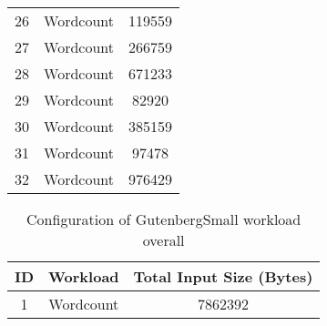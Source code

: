 \documentclass[print,ms]{nuthesis}%
\begin{document}
\begin{table}[h!]
\begin{center}
\begin{threeparttable}
\begin{tabular}{c|c|c}
      26 & Wordcount & 119559  \\
      27 & Wordcount & 266759  \\
      28 & Wordcount & 671233  \\
      29 & Wordcount & 82920  \\
      30 & Wordcount & 385159  \\
      31 & Wordcount & 97478 \\
      32 & Wordcount & 976429 \\   
      \bottomrule %
    \end{tabular}
   \begin{tablenotes}
      \small
      \item %
    \end{tablenotes}
  \end{threeparttable}
  \end{center}
   
\end{table}

\begin{table}[H]%
\tiny
  \begin{center}
     \begin{threeparttable}

    \caption{Configuration of GutenbergSmall workload overall}
    \label{tab:table2}
    \begin{tabular}{c|c|c}%
     \toprule %
      \textbf{ID} & \textbf{Workload} & \textbf{Total Input Size (Bytes)}\\
      \hline
      1 & Wordcount & 7862392\\
      \bottomrule %
    \end{tabular}
    \begin{tablenotes}
      \small
      \item %
    \end{tablenotes}
  \end{threeparttable}
  \end{center}
\end{table}
\end{document}
